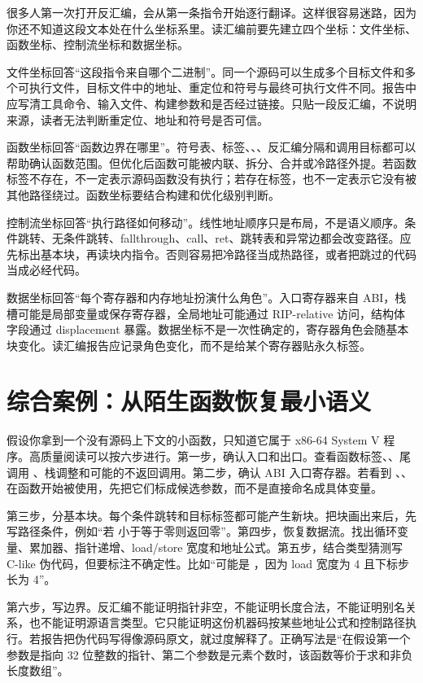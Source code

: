 很多人第一次打开反汇编，会从第一条指令开始逐行翻译。这样很容易迷路，因为你还不知道这段文本处在什么坐标系里。读汇编前要先建立四个坐标：文件坐标、函数坐标、控制流坐标和数据坐标。

文件坐标回答“这段指令来自哪个二进制”。同一个源码可以生成多个目标文件和多个可执行文件，目标文件中的地址、重定位和符号与最终可执行文件不同。报告中应写清工具命令、输入文件、构建参数和是否经过链接。只贴一段反汇编，不说明来源，读者无法判断重定位、地址和符号是否可信。

函数坐标回答“函数边界在哪里”。符号表、标签、、、反汇编分隔和调用目标都可以帮助确认函数范围。但优化后函数可能被内联、拆分、合并或冷路径外提。若函数标签不存在，不一定表示源码函数没有执行；若存在标签，也不一定表示它没有被其他路径绕过。函数坐标要结合构建和优化级别判断。

控制流坐标回答“执行路径如何移动”。线性地址顺序只是布局，不是语义顺序。条件跳转、无条件跳转、fallthrough、call、ret、跳转表和异常边都会改变路径。应先标出基本块，再读块内指令。否则容易把冷路径当成热路径，或者把跳过的代码当成必经代码。

数据坐标回答“每个寄存器和内存地址扮演什么角色”。入口寄存器来自 ABI，栈槽可能是局部变量或保存寄存器，全局地址可能通过 RIP-relative 访问，结构体字段通过 displacement 暴露。数据坐标不是一次性确定的，寄存器角色会随基本块变化。读汇编报告应记录角色变化，而不是给某个寄存器贴永久标签。

\section{综合案例：从陌生函数恢复最小语义}

假设你拿到一个没有源码上下文的小函数，只知道它属于 x86-64 System V 程序。高质量阅读可以按六步进行。第一步，确认入口和出口。查看函数标签、、尾调用 、栈调整和可能的不返回调用。第二步，确认 ABI 入口寄存器。若看到 、、 在函数开始被使用，先把它们标成候选参数，而不是直接命名成具体变量。

第三步，分基本块。每个条件跳转和目标标签都可能产生新块。把块画出来后，先写路径条件，例如“若  小于等于零则返回零”。第四步，恢复数据流。找出循环变量、累加器、指针递增、load/store 宽度和地址公式。第五步，结合类型猜测写 C-like 伪代码，但要标注不确定性。比如“可能是 ，因为 load 宽度为 4 且下标步长为 4”。

第六步，写边界。反汇编不能证明指针非空，不能证明长度合法，不能证明别名关系，也不能证明源语言类型。它只能证明这份机器码按某些地址公式和控制路径执行。若报告把伪代码写得像源码原文，就过度解释了。正确写法是“在假设第一个参数是指向 32 位整数的指针、第二个参数是元素个数时，该函数等价于求和非负长度数组”。


